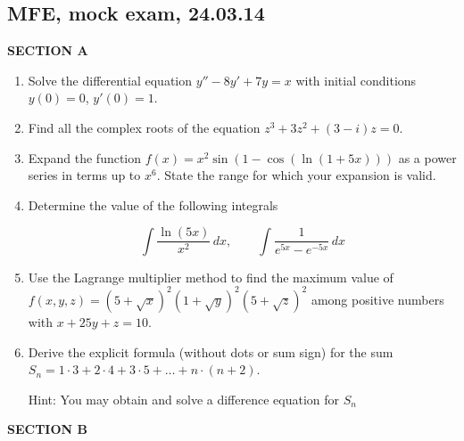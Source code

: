 \subsection{MFE, mock exam, 24.03.14}

\textbf{SECTION A}

\begin{enumerate}
\item Solve the differential equation $y''-8y'+7y=x$ with initial conditions $y(0)=0$, $y'(0)=1$.



\item Find all the complex roots of the equation $z^3+3z^2+(3-i)z=0$.


\item Expand the function $f(x)=x^2\sin(1-\cos(\ln(1+5x)))$  as a power series in terms up to $x^6$. State the range for which your expansion is valid.

\item Determine the value of the following integrals

\[
\int \frac{\ln (5x)}{x^2} \, dx, \qquad \int \frac{1}{e^{5x}-e^{-5x}} \, dx
\]

\item Use the Lagrange multiplier method to find the maximum value of $f(x,y,z)=(5+\sqrt{x})^2(1+\sqrt{y})^2(5+\sqrt{z})^2$ among positive numbers with $x+25y+z=10$.


\item Derive the explicit formula (without dots or sum sign) for the sum $S_n=1\cdot 3+2\cdot 4+3\cdot 5 +\ldots+ n\cdot (n+2)$.

Hint: You may obtain and solve a difference equation for $S_n$


\end{enumerate}

\textbf{SECTION B}

